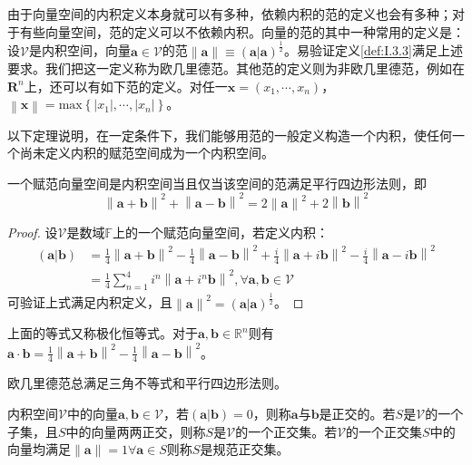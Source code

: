 \documentclass[main.tex]{subfiles}
\begin{document}
由于向量空间的内积定义本身就可以有多种，依赖内积的范的定义也会有多种；对于有些向量空间，范的定义可以不依赖内积。向量的范的其中一种常用的定义是：设$\mathcal{V}$是内积空间，向量$\mathbf{a}\in\mathcal{V}$的范$\left\|\mathbf{a}\right\|\equiv\left(\mathbf{a}|\mathbf{a}\right)^{\frac{1}{2}}$。易验证定义\ref{def:I.3.3}满足上述要求。我们把这一定义称为欧几里德范。其他范的定义则为非欧几里德范，例如在$\mathbf{R}^n$上，还可以有如下范的定义。对任一$\mathbf{x}=\left(x_1,\cdots,x_n\right)$，$\left\|\mathbf{x}\right\|=\mathrm{max}\left\{\left|x_1\right|,\cdots,\left|x_n\right|\right\}$。

以下定理说明，在一定条件下，我们能够用范的一般定义构造一个内积，使任何一个尚未定义内积的赋范空间成为一个内积空间。

\begin{theorem}\label{thm:I.3.1}
一个赋范向量空间是内积空间当且仅当该空间的范满足平行四边形法则，即
\[\left\|\mathbf{a}+\mathbf{b}\right\|^2+\left\|\mathbf{a}-\mathbf{b}\right\|^2=2\left\|\mathbf{a}\right\|^2+2\left\|\mathbf{b}\right\|^2\]
\end{theorem}
\begin{proof}
设$\mathcal{V}$是数域$\mathbb{F}$上的一个赋范向量空间，若定义内积：
\begin{align*}
\left(\mathbf{a}|\mathbf{b}\right)&=\frac{1}{4}\left\|\mathbf{a}+\mathbf{b}\right\|^2-\frac{1}{4}\left\|\mathbf{a}-\mathbf{b}\right\|^2+\frac{i}{4}\left\|\mathbf{a}+i\mathbf{b}\right\|^2-\frac{i}{4}\left\|\mathbf{a}-i\mathbf{b}\right\|^2\\
&=\frac{1}{4}\sum_{n=1}^4i^n\left\|\mathbf{a}+i^n\mathbf{b}\right\|^2,\forall\mathbf{a},\mathbf{b}\in\mathcal{V}
\end{align*}
可验证上式满足内积定义，且$\left\|\mathbf{a}\right\|^2=\left(\mathbf{a}|\mathbf{a}\right)^{\frac{1}{2}}$。
\end{proof}

上面的等式又称极化恒等式。对于$\mathbf{a},\mathbf{b}\in\mathbb{R}^n$则有$\mathbf{a}\cdot\mathbf{b}=\frac{1}{4}\left\|\mathbf{a}+\mathbf{b}\right\|^2-\frac{1}{4}\left\|\mathbf{a}-\mathbf{b}\right\|^2$。

欧几里德范总满足三角不等式和平行四边形法则。

\begin{definition}[正交]
内积空间$\mathcal{V}$中的向量$\mathbf{a},\mathbf{b}\in\mathcal{V}$，若$\left(\mathbf{a}|\mathbf{b}\right)=0$，则称$\mathbf{a}$与$\mathbf{b}$是正交的。若$S$是$\mathcal{V}$的一个子集，且$S$中的向量两两正交，则称$S$是$\mathcal{V}$的一个正交集。若$\mathcal{V}$的一个正交集$S$中的向量均满足$\left\|\mathbf{a}\right\|=1\forall\mathbf{a}\in S$则称$S$是规范正交集。
\end{definition}
\end{document}

